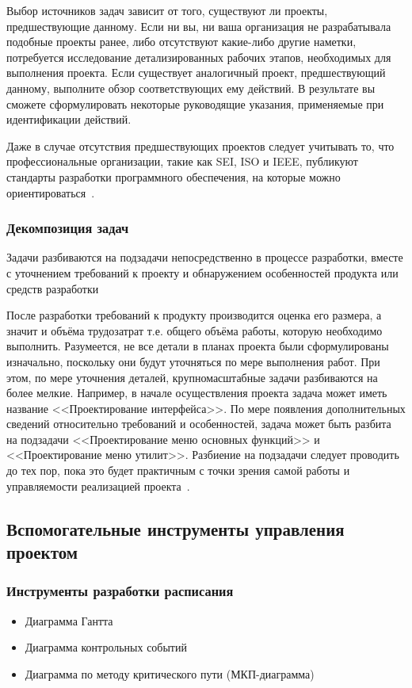 \documentclass{../industrial-development}
\begin{document}
\lecturenotes

Выбор источников задач зависит от того, существуют ли проекты, предшествующие данному. Если ни вы, ни ваша организация не разрабатывала подобные проекты ранее, либо отсутствуют какие-либо другие наметки, потребуется исследование детализированных рабочих этапов, необходимых для выполнения проекта. Если существует аналогичный проект, предшествующий данному, выполните обзор соответствующих ему действий. В результате вы сможете сформулировать некоторые руководящие указания, применяемые при идентификации действий.

Даже в случае отсутствия предшествующих проектов следует учитывать то, что профессиональные организации, такие как SEI, ISO и IEEE, публикуют стандарты разработки программного обеспечения, на которые можно ориентироваться~\cite[с.~281]{Fatrell}.

\begin{frame} \frametitle{Декомпозиция задач}
	\begin{block}{}
		Задачи разбиваются на подзадачи непосредственно в процессе разработки, вместе с уточнением требований к проекту и обнаружением особенностей продукта или средств разработки
	\end{block}
\end{frame}

\lecturenotes

После разработки требований к продукту производится оценка его размера, а значит и объёма трудозатрат т.е. общего объёма работы, которую необходимо выполнить. Разумеется, не все детали в планах проекта были сформулированы изначально, поскольку они будут уточняться по мере выполнения работ. При этом, по мере уточнения деталей, крупномасштабные задачи разбиваются на более мелкие. Например, в начале осуществления проекта задача может иметь название <<Проектирование интерфейса>>. По мере появления дополнительных сведений относительно требований и особенностей, задача может быть разбита на подзадачи <<Проектирование меню основных функций>> и <<Проектирование меню утилит>>. Разбиение на подзадачи следует проводить до тех пор, пока это будет практичным с точки зрения самой работы и управляемости реализацией проекта~\cite[с.~279--280]{Fatrell}.

\subsection{Вспомогательные инструменты управления проектом}

\begin{frame} \frametitle{Инструменты разработки расписания}
  \begin{itemize}
     \item Диаграмма  Гантта
     \item Диаграмма контрольных событий
     \item Диаграмма по методу критического пути (МКП-диаграмма)
    \end{itemize}
\end{frame}
\end{document}
